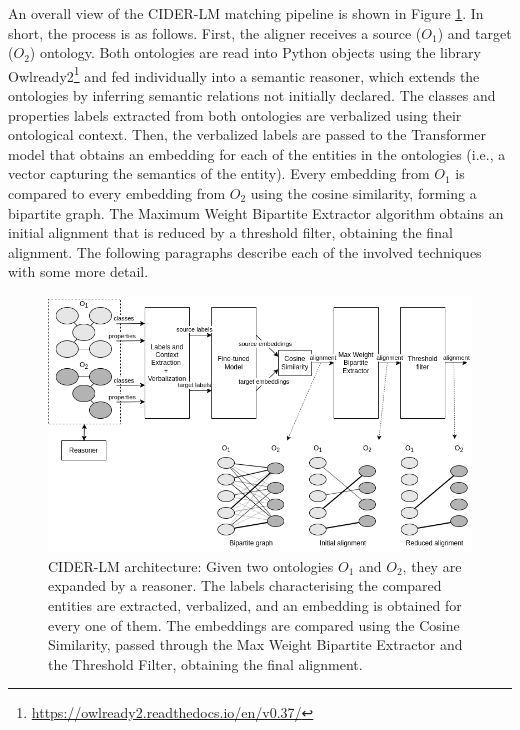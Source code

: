 \documentclass[
]{ceurart}
\begin{document}
An overall view of the CIDER-LM matching pipeline is shown in Figure \ref{fig:architecture}. In short, the process is as follows. First, the aligner receives a source ($O_1$) and target ($O_2$) ontology. Both ontologies are read into Python objects using the library Owlready2\footnote{\url{https://owlready2.readthedocs.io/en/v0.37/}} and fed individually into a semantic reasoner, which extends the ontologies by inferring semantic relations not initially declared. The classes and properties labels extracted from both ontologies are verbalized using their ontological context. Then, the verbalized labels are passed to the Transformer model that obtains an embedding for each of the entities in the ontologies (i.e., a vector capturing the semantics of the entity). Every embedding from $O_1$ is compared to every embedding from $O_2$ using the cosine similarity, forming a bipartite graph. The Maximum Weight Bipartite Extractor algorithm obtains an initial alignment that is reduced by a threshold filter, obtaining the final alignment. The following paragraphs describe each of the involved techniques with some more detail.


\begin{figure}
  \centering
  \includegraphics[width=\linewidth]{cider-lm-architecture-3.drawio.png}
  \caption{CIDER-LM architecture: Given two ontologies $O_1$ and $O_2$, they are expanded by a reasoner. The labels characterising the compared entities are extracted, verbalized, and an embedding is obtained for every one of them. The embeddings are compared using the Cosine Similarity, passed through the Max Weight Bipartite Extractor and the Threshold Filter, obtaining the final alignment.}
  \label{fig:architecture}
\end{figure}
\end{document}

